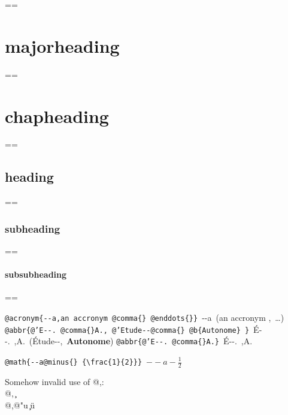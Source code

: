 \documentclass{book}
\makeatletter
\newenvironment{GNUTexinfopreformatted}{%
  \par\GNUTobeylines\obeyspaces\frenchspacing
  \parskip=\z@\parindent=\z@}{}
{\catcode`\^^M=13 \gdef\GNUTobeylines{\catcode`\^^M=13 \def^^M{\null\par}}}
\newenvironment{GNUTexinfoindented}
  {\begin{list}{}{}
  \item\relax}
  {\end{list}}
\newcommand{\GNUTexinfoplaceholder}[1]{}
\newcommand{\GNUTexinfonopagebreakheading}[2]{{\let\clearpage\relax \let\cleardoublepage\relax \let\thispagestyle\GNUTexinfoplaceholder #1{#2}}}
\makeatother
\begin{document}
\begin{GNUTexinfoindented}
\begin{GNUTexinfopreformatted}
\end{GNUTexinfopreformatted}
\GNUTexinfonopagebreakheading{\chapter*}{{majorheading}}
\begin{GNUTexinfopreformatted}%
\ttfamily 
\end{GNUTexinfopreformatted}
\GNUTexinfonopagebreakheading{\chapter*}{{chapheading}}
\begin{GNUTexinfopreformatted}%
\ttfamily 
\end{GNUTexinfopreformatted}
\GNUTexinfonopagebreakheading{\section*}{{heading}}
\begin{GNUTexinfopreformatted}%
\ttfamily 
\end{GNUTexinfopreformatted}
\GNUTexinfonopagebreakheading{\subsection*}{{subheading}}
\begin{GNUTexinfopreformatted}%
\ttfamily 
\end{GNUTexinfopreformatted}
\GNUTexinfonopagebreakheading{\subsubsection*}{{subsubheading}}
\begin{GNUTexinfopreformatted}%
\ttfamily 

\texttt{@acronym\{{-}{-}a,an accronym @comma\{\}\ @enddots\{\}\}}\ {-}{-}a\ (an accronym ,\ \dots{})
\texttt{@abbr\{@'E{-}{-}.\ @comma\{\}A.,\ @'Etude{-}{-}@comma\{\}\ @b\{Autonome\}\ \}}\ \'{E}{-}{-}.\@\ ,A.\@\ (\'{E}tude{-}{-},\ \textbf{Autonome})
\texttt{@abbr\{@'E{-}{-}.\ @comma\{\}A.\}}\ \'{E}{-}{-}.\@\ ,A.\@

\texttt{@math\{{-}{-}a@minus\{\}\ \{\textbackslash{}frac\{1\}\{2\}\}\}}\ $--a- {\frac{1}{2}}$




Somehow invalid use of @,:\leavevmode{}\\
@,\ \c{}\leavevmode{}\\
@,@"u \c{}\"{u}


\end{GNUTexinfopreformatted}
\end{GNUTexinfoindented}
\end{document}

